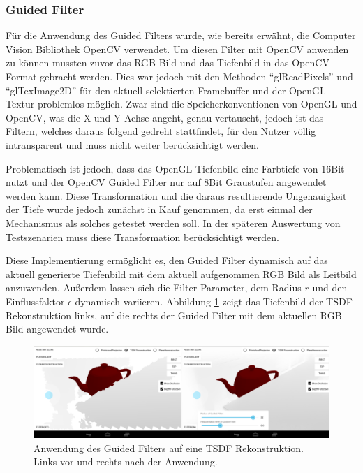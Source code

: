 \subsubsection*{Guided Filter}

Für die Anwendung des Guided Filters wurde, wie bereits erwähnt, die Computer Vision Bibliothek OpenCV verwendet. Um diesen Filter mit OpenCV anwenden zu können mussten zuvor das RGB Bild und das Tiefenbild in das OpenCV Format gebracht werden. Dies war jedoch mit den Methoden \enquote{glReadPixels} und \enquote{glTexImage2D} für den aktuell selektierten Framebuffer und der OpenGL Textur problemlos möglich. Zwar sind die Speicherkonventionen von OpenGL und OpenCV, was die X und Y Achse angeht, genau vertauscht, jedoch ist das Filtern, welches daraus folgend gedreht stattfindet, für den Nutzer völlig intransparent und muss nicht weiter berücksichtigt werden.

Problematisch ist jedoch, dass das OpenGL Tiefenbild eine Farbtiefe von 16Bit nutzt und der OpenCV Guided Filter nur auf 8Bit Graustufen angewendet werden kann. Diese Transformation und die daraus resultierende Ungenauigkeit der Tiefe wurde jedoch zunächst in Kauf genommen, da erst einmal der Mechanismus als solches getestet werden soll. In der späteren Auswertung von Testszenarien muss diese Transformation berücksichtigt werden. 

Diese Implementierung ermöglicht es, den Guided Filter dynamisch auf das aktuell generierte Tiefenbild mit dem aktuell aufgenommen RGB Bild als Leitbild anzuwenden. Außerdem lassen sich die Filter Parameter, dem Radius \(r\) und den Einflussfaktor \(\epsilon\) dynamisch variieren. Abbildung \ref{fig:filter-demo} zeigt das Tiefenbild der TSDF Rekonstruktion links, auf die rechts der Guided Filter mit dem aktuellen RGB Bild angewendet wurde. 

\begin{figure}[h]
  \centering
	\includegraphics[width=1.0\textwidth]{content/images/implementation/filter-demo.png} 
  \caption{Anwendung des Guided Filters auf eine TSDF Rekonstruktion. Links vor und rechts nach der Anwendung.}
  \label{fig:filter-demo}
\end{figure}
